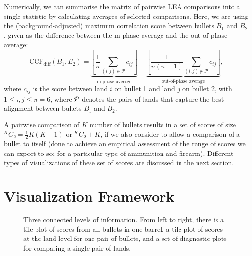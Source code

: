 \documentclass[
  number,
  preprint,
  5p,
  twocolumn]{elsarticle}
\begin{document}
Numerically, we can summarise the matrix of pairwise LEA comparisons
into a single statistic by calculating averages of selected comparisons.
Here, we are using the (background-adjusted) maximum correlation score
\citep{juOpenSourceImplementationCMPS2022} between bullets \(B_1\) and
\(B_2\), given as the difference between the in-phase average and the
out-of-phase average: \[
\mathrm{\overline{CCF}_{diff}}(B_1, B_2) = \underbrace{\left[  \frac{1}{n} \sum_{(i,j) \in \mathcal{P}} c_{ij}\right]}_{\text{in-phase average}} - \underbrace{\left[  \frac{1}{n(n-1)} \sum_{(i,j) \notin \mathcal{P}} c_{ij}\right]}_{\text{out-of-phase average}},
\] where \(c_{ij}\) is the score between land \(i\) on bullet 1 and land
\(j\) on bullet 2, with \(1 \le i, j \le n=6\), where \({\cal P}\)
denotes the pairs of lands that capture the best alignment between
bullets \(B_1\) and \(B_2\).

A pairwise comparison of \(K\) number of bullets results in a set of
scores of size \(^KC_2 = \frac{1}{2}K(K-1)\) or \(^KC_2 + K\), if we
also consider to allow a comparison of a bullet to itself (done to
achieve an empirical assessment of the range of scores we can expect to
see for a particular type of ammunition and firearm). Different types of
visualizations of these set of scores are discussed in the next section.

\section{Visualization Framework}\label{sec-visuals}

\begin{figure}


\caption{\label{fig-tool-pipeline}Three connected levels of information.
From left to right, there is a tile plot of scores from all bullets in
one barrel, a tile plot of scores at the land-level for one pair of
bullets, and a set of diagnostic plots for comparing a single pair of
lands.}

\end{figure}%
\end{document}
